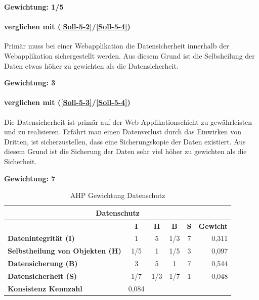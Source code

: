 \textbf{Gewichtung: 1/5}

\paragraph*{ verglichen mit  (\ref{Soll-5-2}/\ref{Soll-5-4})}
Primär muss bei einer Webapplikation die Datensicherheit innerhalb der Webapplikation sichergestellt werden. Aus diesem Grund ist die Selbsheilung der Daten etwas höher zu gewichten als die Datensicherheit.

\textbf{Gewichtung: 3}

\paragraph*{ verglichen mit  (\ref{Soll-5-3}/\ref{Soll-5-4})}
Die Datensicherheit ist primär auf der Web-Applikationschicht zu gewährleisten und zu realisieren. Erfährt man einen Datenverlust durch das Einwirken von Dritten, ist sicherzustellen, dass eine Sicherungskopie der Daten existiert. Aus diesem Grund ist die Sicherung der Daten sehr viel höher zu gewichten als die Sicherheit. 

\textbf{Gewichtung: 7}

\begin{table}[htbp]
\caption{AHP Gewichtung Datenschutz}
\begin{tabular}{|l|c|c|c|c|l|}
\hline
\multicolumn{6}{|c|}{\textbf{Datenschutz}} \\ \hline
 & \multicolumn{1}{c|}{\textbf{I}} & \multicolumn{1}{c|}{\textbf{H}} & \multicolumn{1}{c|}{\textbf{B}} & \multicolumn{1}{c|}{\textbf{S}} & \multicolumn{1}{l|}{\textbf{Gewicht}} \\ \hline
\textbf{Datenintegrität (I)} & 1 & 5 & 1/3 & 7 & \multicolumn{1}{r|}{0,311} \\ \hline
\textbf{Selbstheilung von Objekten (H)} & 1/5 & 1 & 1/5 & 3 & \multicolumn{1}{r|}{0,097} \\ \hline
\textbf{Datensicherung (B)} & 3 & 5 & 1 & 7 & \multicolumn{1}{r|}{0,544} \\ \hline
\textbf{Datensicherheit (S)} & 1/7 & 1/3 & 1/7 & 1 & \multicolumn{1}{r|}{0,048} \\ \hline
\textbf{Konsistenz Kennzahl} & 0,084 \\ \cline{1-2}
\end{tabular}
\label{tab:AHPDatenschutz}
\end{table}

